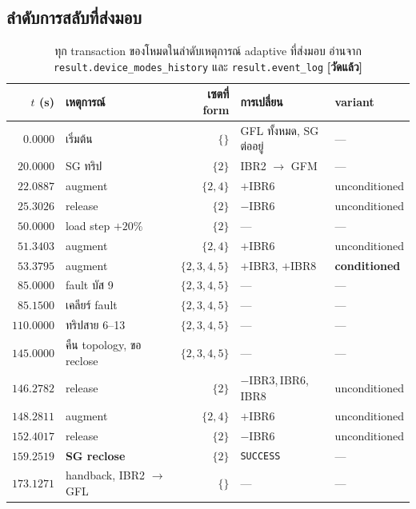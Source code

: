 \documentclass[12pt,a4paper]{article}
\theoremstyle{remark}
\newcommand{\code}[1]{\texttt{\small #1}}
\newcommand{\measured}{\textcolor{ok}{\textbf{[วัดแล้ว]}}}
\begin{document}
\subsection{ลำดับการสลับที่ส่งมอบ}

\begin{table}[H]
\centering
\small
\begin{tabular}{@{}rlrll@{}}
\toprule
$t$ (s) & \textbf{เหตุการณ์} & \textbf{เซตที่ form} & \textbf{การเปลี่ยน} & \textbf{variant}\\
\midrule
$0.0000$    & เริ่มต้น              & $\{\}$               & GFL ทั้งหมด, SG ต่ออยู่ & ---\\
$20.0000$   & SG ทริป               & $\{2\}$              & IBR2 $\to$ GFM     & ---\\
$22.0887$   & augment              & $\{2,4\}$            & $+$IBR6            & unconditioned\\
$25.3026$   & release              & $\{2\}$              & $-$IBR6            & unconditioned\\
$50.0000$   & load step $+20\%$    & $\{2\}$              & ---                & ---\\
$51.3403$   & augment              & $\{2,4\}$            & $+$IBR6            & unconditioned\\
$53.3795$   & augment              & $\{2,3,4,5\}$        & $+$IBR3, $+$IBR8   & \textbf{conditioned}\\
$85.0000$   & fault บัส 9          & $\{2,3,4,5\}$        & ---                & ---\\
$85.1500$   & เคลียร์ fault        & $\{2,3,4,5\}$        & ---                & ---\\
$110.0000$  & ทริปสาย 6--13        & $\{2,3,4,5\}$        & ---                & ---\\
$145.0000$  & คืน topology, ขอ reclose & $\{2,3,4,5\}$    & ---                & ---\\
$146.2782$  & release              & $\{2\}$              & $-$IBR3,\,IBR6,\,IBR8 & unconditioned\\
$148.2811$  & augment              & $\{2,4\}$            & $+$IBR6            & unconditioned\\
$152.4017$  & release              & $\{2\}$              & $-$IBR6            & unconditioned\\
$159.2519$  & \textbf{SG reclose}  & $\{2\}$              & \code{SUCCESS}     & ---\\
$173.1271$  & handback, IBR2 $\to$ GFL & $\{\}$           & ---                & ---\\
\bottomrule
\end{tabular}
\caption{ทุก transaction ของโหมดในลำดับเหตุการณ์ adaptive ที่ส่งมอบ อ่านจาก
\code{result.device\_modes\_history} และ \code{result.event\_log} \measured}
\label{tab:timeline}
\end{table}
\end{document}
